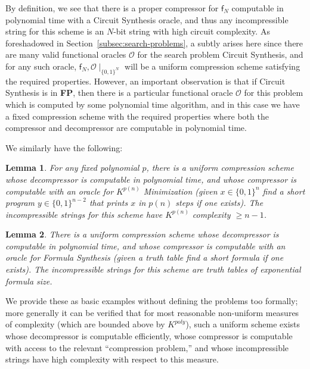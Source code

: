 \documentclass[11pt]{article}
\newtheorem{lemma}{Lemma}
\newcommand{\B}{\{0,1\}}
\def\cl{\bf}
\begin{document}
By definition, we see that there is a proper compressor for $\mathsf{f}_N$ computable in polynomial time with a {\sc Circuit Synthesis} oracle, and thus any incompressible string for this scheme is an $N$-bit string with high circuit complexity. As foreshadowed in Section~\ref{subsec:search-problems}, a subtly arises here since there are many valid functional oracles $\mathcal{O}$ for the search problem {\sc Circuit Synthesis}, and for any such oracle, $\mathsf{f}_N,\mathcal{O}\mid_{\B^N}$ will be a uniform compression scheme satisfying the required properties. However, an important observation is that if {\sc Circuit Synthesis} is in {\cl FP}, then there is a particular functional oracle $\mathcal{O}$ for this problem which is computed by some polynomial time algorithm, and in this case we have a fixed compression scheme with the required properties where both the compressor and decompressor are computable in polynomial time.

We similarly have the following:
\begin{lemma}
For any fixed polynomial $p$, there is a uniform compression scheme whose decompressor is computable in polynomial time, and whose compressor is computable with an oracle for {\sc $K^{p(n)}$ Minimization} (given $x \in \B^n$ find a short program $y \in \B^{n-2}$ that prints $x$ in $p(n)$ steps if one exists). The incompressible strings for this scheme have $K^{p(n)}$ complexity $\geq n-1$.
\end{lemma}
\begin{lemma}
There is a uniform compression scheme whose decompressor is computable in polynomial time, and whose compressor is computable with an oracle for {\sc Formula Synthesis} (given a truth table find a short formula if one exists). The incompressible strings for this scheme are truth tables of exponential formula size.
\end{lemma}
We provide these as basic examples without defining the problems too formally; more generally it can be verified that for most reasonable non-uniform measures of complexity (which are bounded above by $K^{poly}$), such a uniform scheme exists whose decompressor is computable efficiently, whose compressor is computable with access to the relevant ``compression problem,'' and whose incompressible strings have high complexity with respect to this measure.
\end{document}
